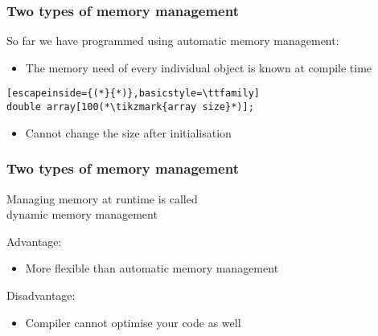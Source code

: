 \documentclass[14pt,a4paper,dvipsnames,usenames]{beamer}
\begin{document}
\begin{frame}[fragile]
  \frametitle{Two types of memory management}

  So far we have programmed using automatic memory management:

  \vspace{.5em}
  \begin{itemize}
    \item The memory need of every individual object is known at compile time
  \end{itemize}

  \begin{lstlisting}[escapeinside={(*}{*)},basicstyle=\ttfamily]
double array[100(*\tikzmark{array size}*)];
  \end{lstlisting}

  \vspace{1em}
  \begin{itemize}
    \item Cannot change the size after initialisation
  \end{itemize}

  \nointerlineskip
\end{frame}

\begin{frame}[fragile]
  \frametitle{Two types of memory management}

  Managing memory at runtime is called\\dynamic memory management

  \vspace{.5em}
  {\color{FeebleWeek}\large Advantage:}
  \begin{itemize}
    \item More flexible than automatic memory management
  \end{itemize}

  \vspace{.5em}
  {\color{Marty}\large{}Disadvantage:}
  { 
  \begin{itemize}
    \item Compiler cannot optimise your code as well
  \end{itemize}
  }
\end{frame}
\end{document}
